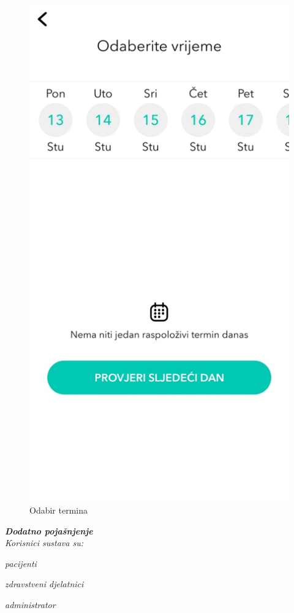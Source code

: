		\begin{figure}[H]
			\includegraphics[scale=0.6]{slike/Buker-odabir-termina.PNG} %
			\centering
			\caption{Odabir termina}
			\label{fig:promjene}
		\end{figure}
		
		\textbf{\textit{Dodatno pojašnjenje}}\\
		
		\textit{Korisnici sustava su:}
		
		\begin{packed_item}
			\item \textit{pacijenti}
			\item \textit{zdravstveni djelatnici}
			\item \textit{administrator}
		\end{packed_item}
		
